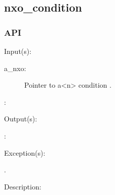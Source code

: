 %
%
%
%
%              

\subsection{nxo\_condition}
\label{nxo_condition}

\subsubsection{API}
\begin{capi}
\label{nxo_condition_}
	\begin{capilist}
	\item[Input(s): ]
		\begin{description}\item[]
		\item[a\_nxo: ]
			Pointer to a<n> condition .
		\item[: ]
		\end{description}
	\item[Output(s): ]
		\begin{description}\item[]
		\item[: ]
		\end{description}
	\item[Exception(s): ]
		\begin{description}\item[]
		\item[.]
		\end{description}
	\item[Description: ]
	\end{capilist}
\end{capi}
